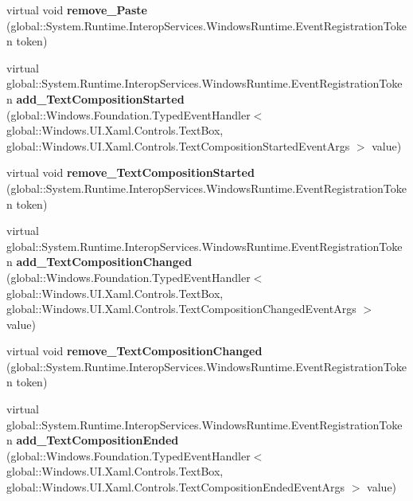 \begin{DoxyCompactItemize}
virtual void {\bfseries remove\+\_\+\+Paste} (global\+::\+System.\+Runtime.\+Interop\+Services.\+Windows\+Runtime.\+Event\+Registration\+Token token)
\item 
\mbox{\label{class_windows_1_1_u_i_1_1_xaml_1_1_controls_1_1_text_box_a7ee5e64932c7b9974d38444e13822e2c}} 
virtual global\+::\+System.\+Runtime.\+Interop\+Services.\+Windows\+Runtime.\+Event\+Registration\+Token {\bfseries add\+\_\+\+Text\+Composition\+Started} (global\+::\+Windows.\+Foundation.\+Typed\+Event\+Handler$<$ global\+::\+Windows.\+U\+I.\+Xaml.\+Controls.\+Text\+Box, global\+::\+Windows.\+U\+I.\+Xaml.\+Controls.\+Text\+Composition\+Started\+Event\+Args $>$ value)
\item 
\mbox{\label{class_windows_1_1_u_i_1_1_xaml_1_1_controls_1_1_text_box_ad3e96b82e37de938e7295300b6dc9c44}} 
virtual void {\bfseries remove\+\_\+\+Text\+Composition\+Started} (global\+::\+System.\+Runtime.\+Interop\+Services.\+Windows\+Runtime.\+Event\+Registration\+Token token)
\item 
\mbox{\label{class_windows_1_1_u_i_1_1_xaml_1_1_controls_1_1_text_box_a4ea12e73d910d27530312ae26996c11a}} 
virtual global\+::\+System.\+Runtime.\+Interop\+Services.\+Windows\+Runtime.\+Event\+Registration\+Token {\bfseries add\+\_\+\+Text\+Composition\+Changed} (global\+::\+Windows.\+Foundation.\+Typed\+Event\+Handler$<$ global\+::\+Windows.\+U\+I.\+Xaml.\+Controls.\+Text\+Box, global\+::\+Windows.\+U\+I.\+Xaml.\+Controls.\+Text\+Composition\+Changed\+Event\+Args $>$ value)
\item 
\mbox{\label{class_windows_1_1_u_i_1_1_xaml_1_1_controls_1_1_text_box_ae941b45f52cc8e88d708275c4313ef9a}} 
virtual void {\bfseries remove\+\_\+\+Text\+Composition\+Changed} (global\+::\+System.\+Runtime.\+Interop\+Services.\+Windows\+Runtime.\+Event\+Registration\+Token token)
\item 
\mbox{\label{class_windows_1_1_u_i_1_1_xaml_1_1_controls_1_1_text_box_a1ec5fb1c372d817e2d83ca0f4160361d}} 
virtual global\+::\+System.\+Runtime.\+Interop\+Services.\+Windows\+Runtime.\+Event\+Registration\+Token {\bfseries add\+\_\+\+Text\+Composition\+Ended} (global\+::\+Windows.\+Foundation.\+Typed\+Event\+Handler$<$ global\+::\+Windows.\+U\+I.\+Xaml.\+Controls.\+Text\+Box, global\+::\+Windows.\+U\+I.\+Xaml.\+Controls.\+Text\+Composition\+Ended\+Event\+Args $>$ value)

\end{DoxyCompactItemize}
